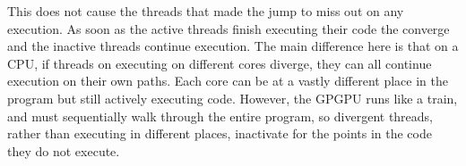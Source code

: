 This does not cause the threads that made the jump to miss out on any execution. As soon as the active threads finish executing their code the converge and the inactive threads continue execution. The main difference here is that on a CPU, if threads on executing on different cores diverge, they can all continue execution on their own paths. Each core can be at a vastly different place in the program but still actively executing code. However, the GPGPU runs like a train, and must sequentially walk through the entire program, so divergent threads, rather than executing in different places, inactivate for the points in the code they do not execute. 